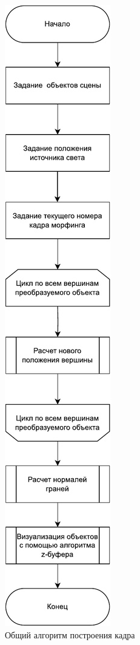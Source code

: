 \begin{figure}[H]
	\centering
	\includegraphics[height=1.45\textwidth]{images/frame_algo_morph.pdf}
	\caption{Общий алгоритм построения кадра}
	\label{fig:frame_algo}
\end{figure}

